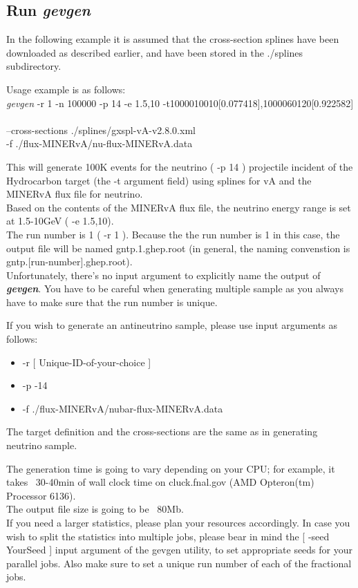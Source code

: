 \subsection{Run {\it gevgen} }

In the following example it is assumed that the cross-section splines have been downloaded as described earlier, 
and have been stored in the ./splines subdirectory.

Usage example is as follows: \\
{\it gevgen} -r 1 -n 100000 -p 14 -e 1.5,10 -t1000010010[0.077418],1000060120[0.922582] \ \\ 
--cross-sections ./splines/gxspl-vA-v2.8.0.xml \ \\
-f ./flux-MINERvA/nu-flux-MINERvA.data

This will generate 100K events for the neutrino ( -p 14 ) projectile incident of the 
Hydrocarbon target (the -t argument field) using splines for vA and the MINERvA flux file for neutrino. \\
Based on the contents of the MINERvA flux file, the neutrino energy range is set at 1.5-10GeV ( -e 1.5,10). \\
The run number is 1 ( -r 1 ). 
Because the the run number is 1 in this case, the output file will be named gntp.1.ghep.root 
(in general, the naming convenstion is gntp.[run-number].ghep.root). \\
Unfortunately, there's no input argument to explicitly name the output of { \bf \it gevgen}.
You have to be careful when generating multiple sample as you always have to make sure that
the run number is unique. 

If you wish to generate an antineutrino sample, please use input arguments as follows:
\begin{itemize}
\item{-r [ Unique-ID-of-your-choice ]}
\item{ -p -14}
\item{ -f ./flux-MINERvA/nubar-flux-MINERvA.data}
\end{itemize}
The target definition and the cross-sections are the same as in generating neutrino sample. 

The generation time is going to vary depending on your CPU; for example, it takes ~30-40min 
of wall clock time on cluck.fnal.gov (AMD Opteron(tm) Processor 6136). \\
The output file size is going to be ~80Mb. \\
If you need a larger statistics, please plan your resources accordingly.
In case you wish to split the statistics into multiple jobs, please bear in mind the [ -seed YourSeed ] 
input argument of the gevgen utility, to set appropriate seeds for your parallel jobs.
Also make sure to set a unique run number of each of the fractional jobs.

